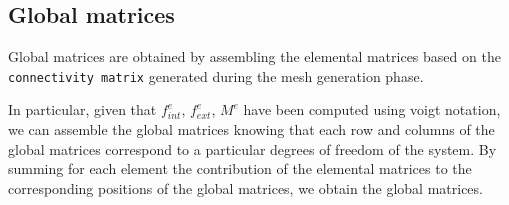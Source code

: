 \subsection{Global matrices}
\label{subsec:global_matrices}

Global matrices are obtained by assembling the elemental matrices based on the \texttt{connectivity matrix} generated during the mesh generation phase.

In particular, given that $f_{int}^e$, $f_{ext}^e$, $M^e$ have been computed using voigt notation, we can assemble the global matrices knowing that each row and columns of the global matrices correspond to a particular degrees of freedom of the system.
By summing for each element the contribution of the elemental matrices to the corresponding positions of the global matrices, we obtain the global matrices.